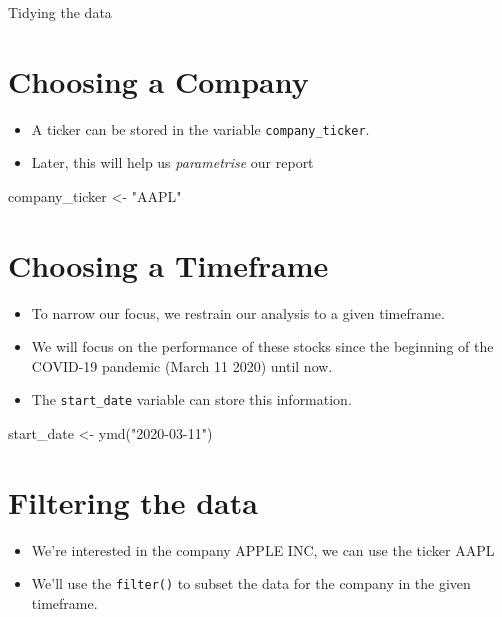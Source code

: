 \documentclass[
  12pt]{article}
\newenvironment{Shaded}{\begin{snugshade}}{\end{snugshade}}
\newcommand{\FunctionTok}[1]{\textcolor[rgb]{0.28,0.35,0.67}{#1}}
\newcommand{\NormalTok}[1]{\textcolor[rgb]{0.00,0.23,0.31}{#1}}
\newcommand{\OtherTok}[1]{\textcolor[rgb]{0.00,0.23,0.31}{#1}}
\newcommand{\StringTok}[1]{\textcolor[rgb]{0.13,0.47,0.30}{#1}}
\theoremstyle{definition}
\theoremstyle{remark}
\begin{document}
Tidying the data

\section{Choosing a Company}

\begin{itemize}
\item
  A ticker can be stored in the variable \texttt{company\_ticker}.
\item
  Later, this will help us \emph{parametrise} our report
\end{itemize}

\begin{Shaded}
\begin{Highlighting}[]
\NormalTok{company\_ticker }\OtherTok{\textless{}{-}} \StringTok{"AAPL"}
\end{Highlighting}
\end{Shaded}

\section{Choosing a Timeframe}

\begin{itemize}
\item
  To narrow our focus, we restrain our analysis to a given timeframe.
\item
  We will focus on the performance of these stocks since the beginning
  of the COVID-19 pandemic (March 11 2020) until now.
\item
  The \texttt{start\_date} variable can store this information.
\end{itemize}

\begin{Shaded}
\begin{Highlighting}[]
\NormalTok{start\_date }\OtherTok{\textless{}{-}}  \FunctionTok{ymd}\NormalTok{(}\StringTok{"2020{-}03{-}11"}\NormalTok{)}
\end{Highlighting}
\end{Shaded}

\section{Filtering the data}

\begin{itemize}
\item
  We're interested in the company APPLE INC, we can use the ticker AAPL
\item
  We'll use the \texttt{filter()} to subset the data for the company in
  the given timeframe.
\end{itemize}
\end{document}
